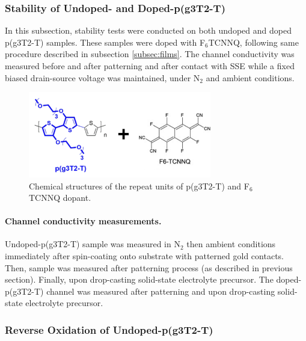 \subsubsection{Stability of Undoped- and Doped-p(g3T2-T)}
In this subsection, stability tests were conducted on both undoped and doped p(g3T2-T) samples. These samples were doped with F$_{6}$TCNNQ, following same procedure described in subsection \ref{subsec:films}. The channel conductivity was measured %
before and after patterning and after contact with SSE %
while a fixed biased drain-source voltage was maintained, under N$_{2}$ and ambient conditions. %

\begin{figure}[ht]
  \centering
  \includegraphics[width=8cm]{Images/pdf/doping_formulas2.pdf}
  \caption{Chemical structures of the repeat units of p(g3T2-T) and F$_{6}$TCNNQ dopant.}
  \label{fig:dop2}
\end{figure}

\paragraph{Channel conductivity measurements.}Undoped-p(g3T2-T) sample was measured in N$_{2}$ then ambient conditions immediately after spin-coating onto substrate with patterned gold contacts. Then, sample was measured after patterning process (as described in previous section). Finally, upon drop-casting solid-state electrolyte precursor. The doped-p(g3T2-T) channel was measured after patterning and upon drop-casting solid-state electrolyte precursor.

\subsubsection{Reverse Oxidation of Undoped-p(g3T2-T)}

